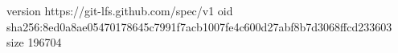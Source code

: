 version https://git-lfs.github.com/spec/v1
oid sha256:8ed0a8ae05470178645c7991f7acb1007fe4c600d27abf8b7d3068ffcd233603
size 196704
